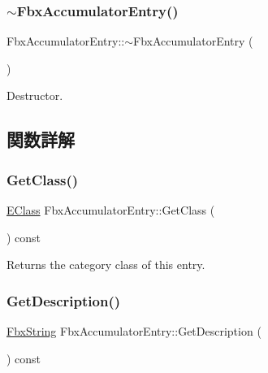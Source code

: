 \subsubsection{\texorpdfstring{$\sim$\+Fbx\+Accumulator\+Entry()}{~FbxAccumulatorEntry()}}
{\footnotesize\ttfamily Fbx\+Accumulator\+Entry\+::$\sim$\+Fbx\+Accumulator\+Entry (\begin{DoxyParamCaption}{ }\end{DoxyParamCaption})}



Destructor. 



\subsection{関数詳解}
\mbox{\label{class_fbx_accumulator_entry_a2c6baa9720f96ecf7a9cc69f89b5c430}} 
\subsubsection{\texorpdfstring{Get\+Class()}{GetClass()}}
{\footnotesize\ttfamily \hyperlink{class_fbx_accumulator_entry_af08af3ddcbf7e8fe642d7e9ecb4ad0e2}{E\+Class} Fbx\+Accumulator\+Entry\+::\+Get\+Class (\begin{DoxyParamCaption}{ }\end{DoxyParamCaption}) const}



Returns the category class of this entry. 

\mbox{\label{class_fbx_accumulator_entry_a37cfbde3b74cda66945b948b4d6acd7c}} 
\subsubsection{\texorpdfstring{Get\+Description()}{GetDescription()}}
{\footnotesize\ttfamily \hyperlink{class_fbx_string}{Fbx\+String} Fbx\+Accumulator\+Entry\+::\+Get\+Description (\begin{DoxyParamCaption}{ }\end{DoxyParamCaption}) const}



